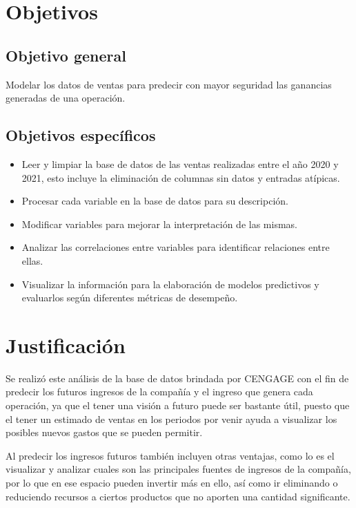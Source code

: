 \documentclass{article}
\begin{document}
    \section{Objetivos}
        \subsection{Objetivo general}
        Modelar los datos de ventas para predecir con mayor seguridad las ganancias generadas de una operación.

        \subsection{Objetivos específicos}
            \begin{itemize}
                \item Leer y limpiar la base de datos de las ventas realizadas entre el año 2020 y 2021, esto incluye la eliminación de columnas sin datos y entradas atípicas.
                \item Procesar cada variable en la base de datos para su descripción.
                \item Modificar variables para mejorar la interpretación de las mismas. 
                \item Analizar las correlaciones entre variables para identificar relaciones entre ellas.
                \item Visualizar la información para la elaboración de modelos predictivos y evaluarlos según diferentes métricas de desempeño. 
            \end{itemize}

    \section{Justificación}
        Se realizó este análisis de la base de datos brindada por CENGAGE con el fin de predecir los futuros ingresos de la compañía y el ingreso que genera cada operación, ya que el tener una visión a futuro puede ser bastante útil, puesto que el tener un estimado de ventas en los periodos por venir ayuda a visualizar los posibles nuevos gastos que se pueden permitir.

        Al predecir los ingresos futuros también incluyen otras ventajas, como lo es el visualizar y analizar cuales son las principales fuentes de ingresos de la compañía, por lo que en ese espacio pueden invertir más en ello, así como ir eliminando o reduciendo recursos a ciertos productos que no aporten una cantidad significante.
        
\end{document}
